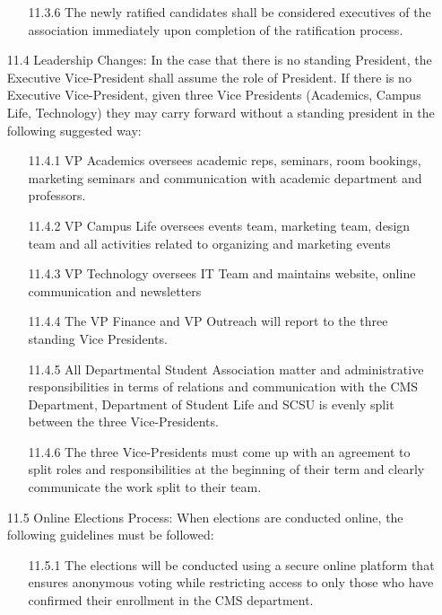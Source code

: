 \documentclass[12pt,a4paper]{article}
\begin{document}
\begin{enumerate}
\begin{enumerate}
\item[11.3.6] The newly ratified candidates shall be considered executives of the association immediately upon completion of the ratification process.
\end{enumerate}

\item[11.4] Leadership Changes: In the case that there is no standing President, the Executive Vice-President shall assume the role of President. If there is no Executive Vice-President, given three Vice Presidents (Academics, Campus Life, Technology) they may carry forward without a standing president in the following suggested way:

\begin{enumerate}
\item[11.4.1] VP Academics oversees academic reps, seminars, room bookings, marketing seminars and communication with academic department and professors.

\item[11.4.2] VP Campus Life oversees events team, marketing team, design team and all activities related to organizing and marketing events

\item[11.4.3] VP Technology oversees IT Team and maintains website, online communication and newsletters

\item[11.4.4] The VP Finance and VP Outreach will report to the three standing Vice Presidents.

\item[11.4.5] All Departmental Student Association matter and administrative responsibilities in terms of relations and communication with the CMS Department, Department of Student Life and SCSU is evenly split between the three Vice-Presidents.

\item[11.4.6] The three Vice-Presidents must come up with an agreement to split roles and responsibilities at the beginning of their term and clearly communicate the work split to their team.
\end{enumerate}

\item[11.5] Online Elections Process: When elections are conducted online, the following guidelines must be followed:

\begin{enumerate}
\item[11.5.1] The elections will be conducted using a secure online platform that ensures anonymous voting while restricting access to only those who have confirmed their enrollment in the CMS department.


\end{enumerate}
\end{enumerate}
\end{document}
